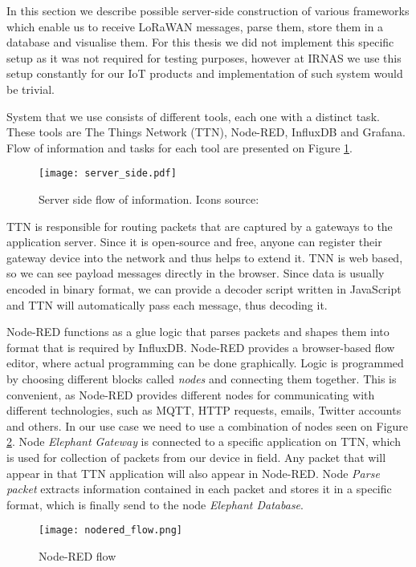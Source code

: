In this section we describe possible server-side construction of various frameworks which enable us to receive LoRaWAN messages, parse them, store them in a database and visualise them.
For this thesis we did not implement this specific setup as it was not required for testing purposes, however at IRNAS we use this setup constantly for our IoT products and implementation of such system would be trivial.

System that we use consists of different tools, each one with a distinct task.
These tools are The Things Network (TTN), Node-RED, InfluxDB and Grafana.
Flow of information and tasks for each tool are presented on Figure \ref{server_side}.

\begin{figure}[ht]
    \centering
    \texttt{[image: server\_side.pdf]} 
    \caption[Server side flow of information.]{Server side flow of information. Icons source:\cite{icons}}
    \label{server_side}
\end{figure}

TTN is responsible for routing packets that are captured by a gateways to the application server.
Since it is open-source and free, anyone can register their gateway device into the network and thus helps to extend it.
TNN is web based, so we can see payload messages directly in the browser.
Since data is usually encoded in binary format, we can provide a decoder script written in JavaScript and TTN will automatically pass each message, thus decoding it.

Node-RED functions as a glue logic that parses packets and shapes them into format that is required by InfluxDB.
Node-RED provides a browser-based flow editor, where actual programming can be done graphically.
Logic is programmed by choosing different blocks called \textit{nodes} and connecting them together.
This is convenient, as Node-RED provides different nodes for communicating with different technologies, such as MQTT, HTTP requests, emails, Twitter accounts and others.
In our use case we need to use a combination of nodes seen on Figure \ref{nodered_flow}.
Node \textit{Elephant Gateway} is connected to a specific application on TTN, which is used for collection of packets from our device in field.
Any packet that will appear in that TTN application will also appear in Node-RED.
Node \textit{Parse packet} extracts information contained in each packet and stores it in a specific format, which is finally send to the node \textit{Elephant Database}.

\begin{figure}[ht]
    \centering
    \texttt{[image: nodered\_flow.png]} 
    \caption{ Node-RED flow}
    \label{nodered_flow}
\end{figure}

